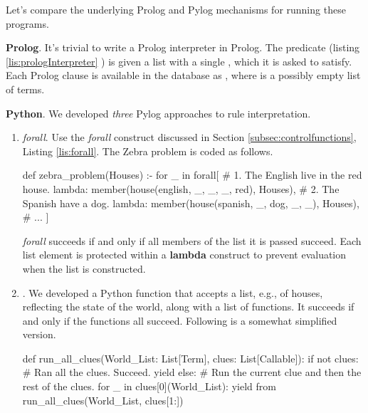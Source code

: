 \smallv
Let's compare the underlying Prolog and Pylog mechanisms for running these programs. 
\smallv

\textbf{Prolog}. It's trivial to write a Prolog interpreter in Prolog. The  predicate (listing \ref{lis:prologInterpreter} \cite{Bartak1998}) is given a list with a single , which it is asked to satisfy. Each Prolog clause is available in the database as , where   is a possibly empty list of terms.   

\smallv
\textbf{Python}. We developed \textit{three} Pylog approaches to rule interpretation. 
\begin{enumerate}

\item \textit{forall}. Use the \textit{forall} construct discussed in Section \ref{subsec:controlfunctions}, Listing \ref{lis:forall}. The Zebra problem is coded as follows.

\begin{minipage}{\linewidth}
\begin{python}
def zebra_problem(Houses) :-
    for _ in forall{[
        # 1. The English live in the red house.
        lambda: member(house(english, _, _, _, red), Houses), 
        # 2. The Spanish have a dog.
        lambda: member(house(spanish, _, dog, _, _), Houses), 
        # ...
        ]}
\end{python}
\end{minipage}

\textit{forall} succeeds if and only if all members of the list it is passed succeed. Each list element is protected within a \textbf{lambda} construct to prevent evaluation when the list is constructed.
\smallv

\item {}. We developed a Python function that accepts a list, e.g., of houses, reflecting the state of the world, along with a list of functions. It succeeds if and only if the functions all succeed. Following is a somewhat simplified version.

\begin{minipage}{\linewidth}
\begin{python}
def run_all_clues(World_List: List[Term], clues: List[Callable]):
    if not clues:
      # Ran all the clues. Succeed.
      yield
    else:
      # Run the current clue and then the rest of the clues.
      for _ in clues[0](World_List):
        yield from run_all_clues(World_List, clues[1:])
\end{python}
\end{minipage}


\end{enumerate}
